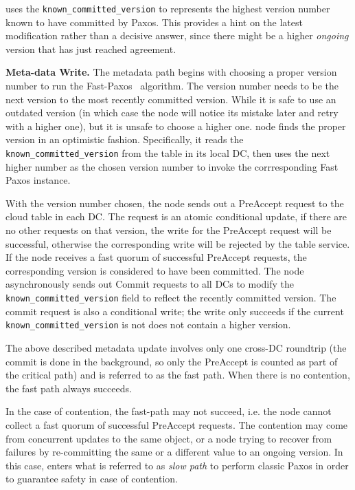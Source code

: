 {\name} uses the {\tt known\_committed\_version} to represents the highest 
version number known to have committed by Paxos.  This provides a hint on the latest 
modification rather than a decisive answer, since there might be a higher
\emph{ongoing} version that has just reached agreement.  

{\bf Meta-data Write.}
The metadata path begins with
choosing a proper version number to run the Fast-Paxos~\cite{fastpaxos} algorithm. The version number needs
to be the next version to the most recently committed version.  While it is safe to use an outdated
version (in which case the {\name} node will notice its mistake later and retry with a higher one),
but it is unsafe to choose a higher one. {\name} node finds the proper version in an
optimistic fashion. Specifically, it reads the {\tt known\_committed\_version} from the
table in its local DC, then uses the next higher number as the chosen version number to 
invoke the corrresponding Fast Paxos instance.

With the version number chosen, the {\name} node sends out a PreAccept request to the cloud table
in each DC. The request is an atomic conditional update, if there are no other 
requests on that version, the write for the PreAccept request will be successful, otherwise
the corresponding write will be rejected by the table service. If the {\name} node receives a fast quorum of successful PreAccept requests, the
corresponding version is considered to have been committed. The {\name} node asynchronously 
sends out Commit requests to all DCs to modify the {\tt known\_committed\_version} field to 
reflect the recently committed version.  The commit request is also a
conditional write; the write only succeeds if the current {\tt
known\_committed\_version} is not does not contain a higher version.

The above described metadata update involves only one cross-DC roundtrip (the
commit is done in the background, so only the PreAccept is counted as part of
the critical path) and is referred to as the fast path.  When there is no
contention, the fast path always succeeds. 

In the case of contention, the fast-path may not succeed, i.e. the {\name} node
cannot collect a fast quorum of successful PreAccept requests. The contention
may come from concurrent updates to the same object, or a {\name} node trying
to recover from failures by re-committing the same or a different value to an
ongoing version.  In this case, {\name} enters what is referred to as
\emph{slow path} to perform classic Paxos in order to guarantee safety in case of
contention.

